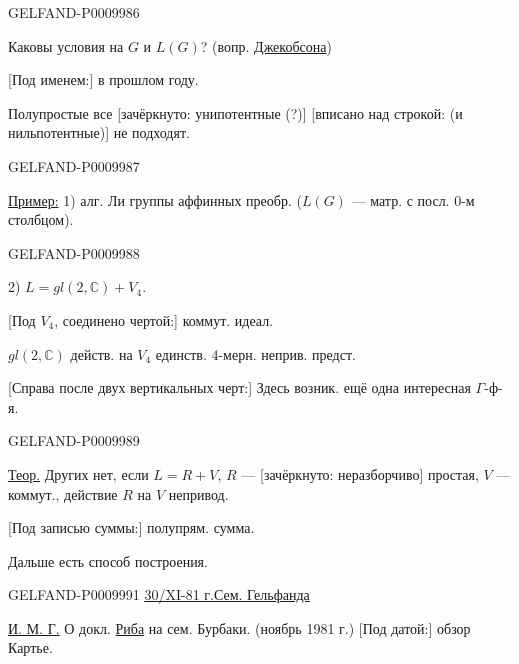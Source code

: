 \begin{GelfandAdjacentEvidence}{GELFAND-P000998}{6}


Каковы условия на $G$ и $L(G)$? (вопр. \underline{Джекобсона})

[Под именем:] в прошлом году.

Полупростые все [зачёркнуто: унипотентные (?)] [вписано над строкой: (и нильпотентные)] не подходят.
\end{GelfandAdjacentEvidence}
\begin{GelfandAdjacentEvidence}{GELFAND-P000998}{7}


\underline{Пример:} 1) алг. Ли группы аффинных преобр. ($L(G)$ --- матр. с посл. $0$-м столбцом).
\end{GelfandAdjacentEvidence}
\begin{GelfandAdjacentEvidence}{GELFAND-P000998}{8}


2) $L=gl(2,\mathbb C)+V_4$.

[Под $V_4$, соединено чертой:] коммут. идеал.

$gl(2,\mathbb C)$ действ. на $V_4$ единств. $4$-мерн. неприв. предст.

[Справа после двух вертикальных черт:] Здесь возник. ещё одна интересная $\Gamma$-ф-я.
\end{GelfandAdjacentEvidence}
\begin{GelfandAdjacentEvidence}{GELFAND-P000998}{9}


\underline{Теор.} Других нет, если $L=R+V$, $R$ --- [зачёркнуто: неразборчиво] простая, $V$ --- коммут., действие $R$ на $V$ непривод.
\end{GelfandAdjacentEvidence}


[Под записью суммы:] полупрям. сумма.

Дальше есть способ построения.


\begin{GelfandAdjacentEvidence}{GELFAND-P000999}{1}
\underline{\underline{30/XI-81 г.}}\quad\underline{Сем. Гельфанда}

\underline{И. М. Г.} О докл. \underline{Риба} на сем. Бурбаки. (ноябрь 1981 г.)
[Под датой:] обзор Картье.
\end{GelfandAdjacentEvidence}



